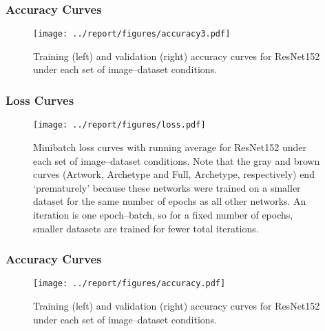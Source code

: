 \documentclass[11pt]{beamer}
\begin{document}
\begin{frame}
	\frametitle{Accuracy Curves}%

	\vspace{-0.5cm}
	\begin{figure}[h]
	\begin{center}
	\texttt{[image: ../report/figures/accuracy3.pdf]}
	\end{center}
	\caption[caption]{Training (left) and validation (right) accuracy curves for ResNet152 under each set of image--dataset conditions.}
	\label{fig:acc}
	\end{figure}

\end{frame}


\begin{frame}
	\frametitle{Loss Curves}

	\vspace{-0.75cm}
	\begin{figure}[btp]
	\begin{center}
	\texttt{[image: ../report/figures/loss.pdf]}
	\end{center}
	\caption[caption]{Minibatch loss curves with running average for ResNet152 under each set of image--dataset conditions. Note that the gray and brown curves (Artwork, Archetype and Full, Archetype, respectively) end `prematurely' because these networks were trained on a smaller dataset for the same number of epochs as all other networks. An iteration is one epoch--batch, so for a fixed number of epochs, smaller datasets are trained for fewer total iterations.}
	\label{fig:loss}
	\end{figure}

\end{frame}

\begin{frame}
	\frametitle{Accuracy Curves}

	\vspace{-0.5cm}
	\begin{figure}[h]
	\begin{center}
	\texttt{[image: ../report/figures/accuracy.pdf]}
	\end{center}
	\caption[caption]{Training (left) and validation (right) accuracy curves for ResNet152 under each set of image--dataset conditions.}
	\label{fig:acc}
	\end{figure}

\end{frame}
\end{document}
